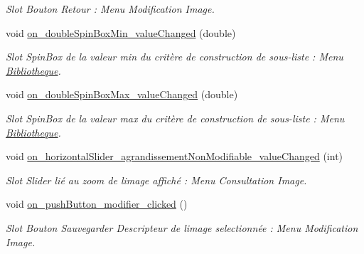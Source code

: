 \begin{DoxyCompactItemize}
\begin{DoxyCompactList}\small\item\em Slot Bouton Retour \+: Menu Modification Image. \end{DoxyCompactList}\item 
\mbox{\label{classMainWindow_a94b88633fa3b8b6eb9727f973f20a8a1}} 
void \hyperlink{classMainWindow_a94b88633fa3b8b6eb9727f973f20a8a1}{on\+\_\+double\+Spin\+Box\+Min\+\_\+value\+Changed} (double)
\begin{DoxyCompactList}\small\item\em Slot Spin\+Box de la valeur min du critère de construction de sous-\/liste \+: Menu \hyperlink{classBibliotheque}{Bibliotheque}. \end{DoxyCompactList}\item 
\mbox{\label{classMainWindow_a9c2d4a213092fef9a1ca6341bf01f558}} 
void \hyperlink{classMainWindow_a9c2d4a213092fef9a1ca6341bf01f558}{on\+\_\+double\+Spin\+Box\+Max\+\_\+value\+Changed} (double)
\begin{DoxyCompactList}\small\item\em Slot Spin\+Box de la valeur max du critère de construction de sous-\/liste \+: Menu \hyperlink{classBibliotheque}{Bibliotheque}. \end{DoxyCompactList}\item 
\mbox{\label{classMainWindow_a37fc7ed847837660646dcf4d315f72b6}} 
void \hyperlink{classMainWindow_a37fc7ed847837660646dcf4d315f72b6}{on\+\_\+horizontal\+Slider\+\_\+agrandissement\+Non\+Modifiable\+\_\+value\+Changed} (int)
\begin{DoxyCompactList}\small\item\em Slot Slider lié au zoom de l\textquotesingle{}image affiché \+: Menu Consultation Image. \end{DoxyCompactList}\item 
\mbox{\label{classMainWindow_a70f495382f691edf5ac4c5b754249c21}} 
void \hyperlink{classMainWindow_a70f495382f691edf5ac4c5b754249c21}{on\+\_\+push\+Button\+\_\+modifier\+\_\+clicked} ()
\begin{DoxyCompactList}\small\item\em Slot Bouton Sauvegarder Descripteur de l\textquotesingle{}image selectionnée \+: Menu Modification Image. \end{DoxyCompactList}\item 

\end{DoxyCompactItemize}
